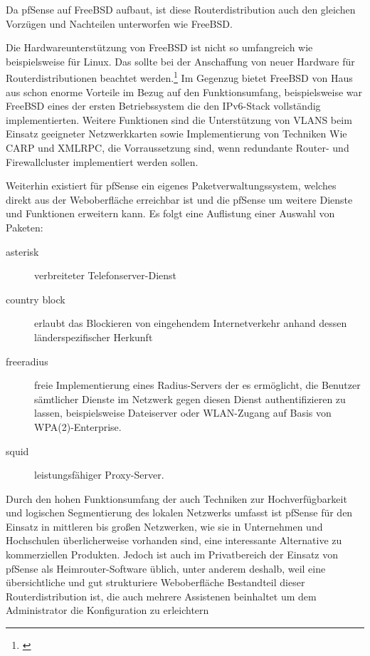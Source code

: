 \documentclass[a4paper,12pt]{scrartcl}
\begin{document}
Da pfSense auf FreeBSD aufbaut, ist diese Routerdistribution auch den gleichen
Vorz\"ugen und Nachteilen unterworfen wie FreeBSD.

Die Hardwareunterst\"utzung von FreeBSD ist nicht so umfangreich wie
beispielsweise f\"ur Linux. Das sollte bei der Anschaffung von neuer Hardware
f\"ur Routerdistributionen beachtet werden.\footnote{\cite{FreeBSDHardware}} Im
Gegenzug bietet FreeBSD von Haus aus schon enorme Vorteile im Bezug auf den
Funktionsumfang, beispielsweise war FreeBSD eines der ersten Betriebssystem die
den IPv6-Stack vollst\"andig implementierten. Weitere Funktionen sind die
Unterst\"utzung von VLANS beim Einsatz geeigneter Netzwerkkarten sowie
Implementierung von Techniken Wie CARP und XMLRPC, die Vorraussetzung sind,
wenn redundante Router- und Firewallcluster implementiert werden sollen.

Weiterhin existiert f\"ur pfSense ein eigenes Paketverwaltungssystem, welches
direkt aus der Weboberfl\"ache erreichbar ist und die pfSense um weitere
Dienste und Funktionen erweitern kann. Es folgt eine Auflistung einer Auswahl
von Paketen:
\begin{description}
 \item[asterisk] verbreiteter Telefonserver-Dienst
 \item[country block] erlaubt das Blockieren von eingehendem Internetverkehr
anhand dessen l\"anderspezifischer Herkunft
 \item[freeradius] freie Implementierung eines Radius-Servers der es
erm\"oglicht, die Benutzer s\"amtlicher Dienste im Netzwerk gegen diesen Dienst
authentifizieren zu lassen, beispielsweise Dateiserver oder WLAN-Zugang auf
Basis von WPA(2)-Enterprise.
 \item[squid] leistungsf\"ahiger Proxy-Server.
\end{description}

Durch den hohen Funktionsumfang der auch Techniken zur Hochverf\"ugbarkeit und
logischen Segmentierung des lokalen Netzwerks umfasst ist pfSense f\"ur den
Einsatz in mittleren bis gro\ss{}en Netzwerken, wie sie in Unternehmen und
Hochschulen \"uberlicherweise vorhanden sind, eine interessante Alternative zu
kommerziellen Produkten. Jedoch ist auch im Privatbereich der Einsatz von
pfSense als Heimrouter-Software \"ublich, unter anderem deshalb, weil eine
\"ubersichtliche und gut strukturiere Weboberfl\"ache Bestandteil dieser
Routerdistribution ist, die auch mehrere Assistenen beinhaltet um dem
Administrator die Konfiguration zu erleichtern
\end{document}
